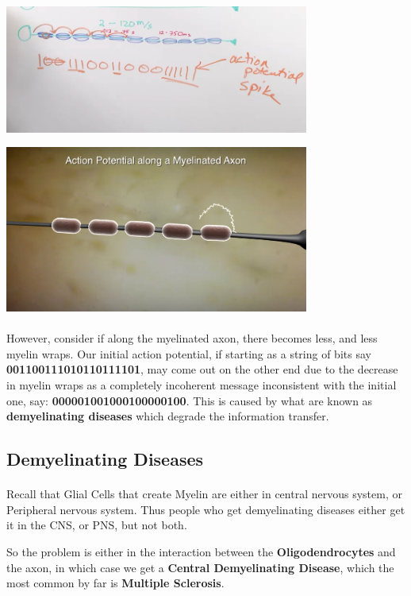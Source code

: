 \documentclass[12pt, a4paper]{article}
\begin{document}
{
    \centering
    \includegraphics[width=10cm]{myelinated_axon_whiteboard.png}

    \includegraphics[width=10cm]{action_potential_myelinated_axon_animated.png}
    
}

\paragraph*{}
However, consider if along the myelinated axon, there becomes less, and less myelin wraps.
Our initial action potential, if starting as a string of bits say \textbf{001100111010110111101}, may come out on the other end
due to the decrease in myelin wraps as a completely incoherent message inconsistent with the initial one, say: \textbf{000001001000100000100}.
This is caused by what are known as \textbf{demyelinating diseases} which degrade the information transfer.

\subsection{Demyelinating Diseases}
\paragraph*{}
Recall that Glial Cells that create Myelin are either in central nervous system, or Peripheral nervous system. Thus people
who get demyelinating diseases either get it in the CNS, or PNS, but not both.

So the problem is either in the interaction between the \textbf{Oligodendrocytes} and the axon,
in which case we get a \textbf{Central Demyelinating Disease}, which the most common by far is \textbf{Multiple Sclerosis}.
\end{document}
